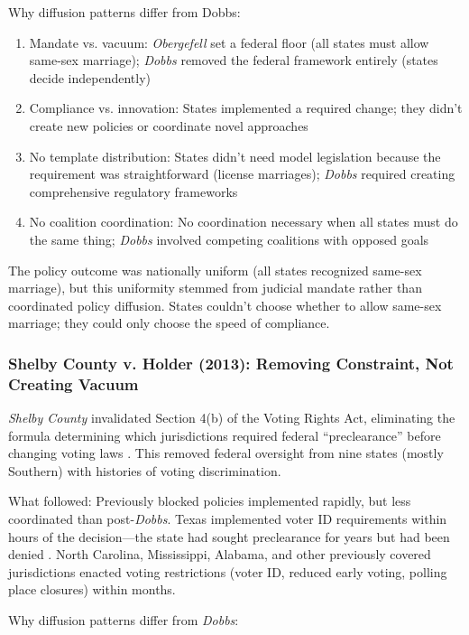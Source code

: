 Why diffusion patterns differ from Dobbs:

\begin{enumerate}
\item Mandate vs. vacuum: \emph{Obergefell} set a federal floor (all states must allow same-sex marriage); \emph{Dobbs} removed the federal framework entirely (states decide independently)
\item Compliance vs. innovation: States implemented a required change; they didn't create new policies or coordinate novel approaches
\item No template distribution: States didn't need model legislation because the requirement was straightforward (license marriages); \emph{Dobbs} required creating comprehensive regulatory frameworks
\item No coalition coordination: No coordination necessary when all states must do the same thing; \emph{Dobbs} involved competing coalitions with opposed goals
\end{enumerate}

The policy outcome was nationally uniform (all states recognized same-sex marriage), but this uniformity stemmed from judicial mandate rather than coordinated policy diffusion. States couldn't choose whether to allow same-sex marriage; they could only choose the speed of compliance.

\subsubsection{Shelby County v. Holder (2013): Removing Constraint, Not Creating Vacuum}

\emph{Shelby County} invalidated Section 4(b) of the Voting Rights Act, eliminating the formula determining which jurisdictions required federal ``preclearance'' before changing voting laws \parencite{ShelbyCountyAla2013}. This removed federal oversight from nine states (mostly Southern) with histories of voting discrimination.

What followed: Previously blocked policies implemented rapidly, but less coordinated than post-\emph{Dobbs}. Texas implemented voter ID requirements within hours of the decision---the state had sought preclearance for years but had been denied \parencite{EffectsShelbyCounty2023}. North Carolina, Mississippi, Alabama, and other previously covered jurisdictions enacted voting restrictions (voter ID, reduced early voting, polling place closures) within months.

Why diffusion patterns differ from \emph{Dobbs}:

